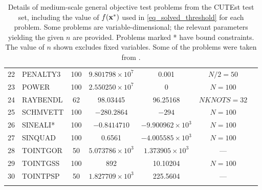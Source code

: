\begin{table}[H]
{\begin{tabular}{rlccccc}
		22 & PENALTY3 & 100 & $9.801798\times 10^{7}$ & 0.001 & $N/2 = 50$ \\
		23 & POWER & 100 & $2.550250\times 10^{7}$ & 0 & $N = 100$ \\
		24 & RAYBENDL & 62 & 98.03445 & 96.25168 & $NKNOTS = 32$ \\
		25 & SCHMVETT & 100 & $-280.2864$ & $-294$ & $N = 100$ \\
		26 & SINEALI* & 100 & $-0.8414710$ & $-9.900962\times 10^{3}$ & $N = 100$ \\
		27 & SINQUAD & 100 & 0.6561 & $-4.005585\times 10^{3}$ & $N = 100$ \\
		28 & TOINTGOR & 50 & $5.073786\times 10^{3}$ & $1.373905\times 10^{3}$ & --- \\
		29 & TOINTGSS & 100 & 892 & 10.10204 & $N = 100$ \\
		30 & TOINTPSP & 50 & $1.827709\times 10^{3}$ & 225.5604 & --- \\
		\noalign{\smallskip}\hline
	\end{tabular}}
	\caption{Details of medium-scale general objective test problems from the CUTEst test set, including the value of $f(\mathbf{x}^*)$ used in \eqref{eq_solved_threshold} for each problem. Some problems are variable-dimensional; the relevant parameters yielding the given $n$ are provided. Problems marked * have bound constraints. The value of $n$ shown excludes fixed variables. Some of the problems were taken from \cite{Luksan2010}.}
	\label{tab_genobj_problems}
\end{table}

